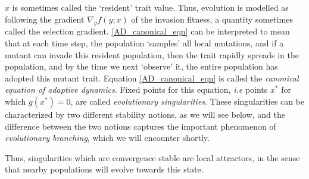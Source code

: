 $x$ is sometimes called the `resident' trait value. Thus, evolution is modelled as following the gradient $\nabla_y f(y;x)$ of the invasion fitness, a quantity sometimes called the selection gradient. \eqref{AD_canonical_eqn} can be interpreted to mean that at each time step, the population `samples' all local mutations, and if a mutant can invade this resident population, then the trait rapidly spreads in the population, and by the time we next `observe' it, the entire population has adopted this mutant trait. Equation \eqref{AD_canonical_eqn} is called the \emph{canonical equation of adaptive dynamics}. Fixed points for this equation, \textit{i.e} points $x^*$ for which $g(x^*)=0$, are called \emph{evolutionary singularities}. These singularities can be characterized by two different stability notions, as we will see below, and the difference between the two notions captures the important phenomenon of \textit{evolutionary branching}, which we will encounter shortly.


Thus, singularities which are convergence stable are local attractors, in the sense that nearby populations will evolve towards this state.

